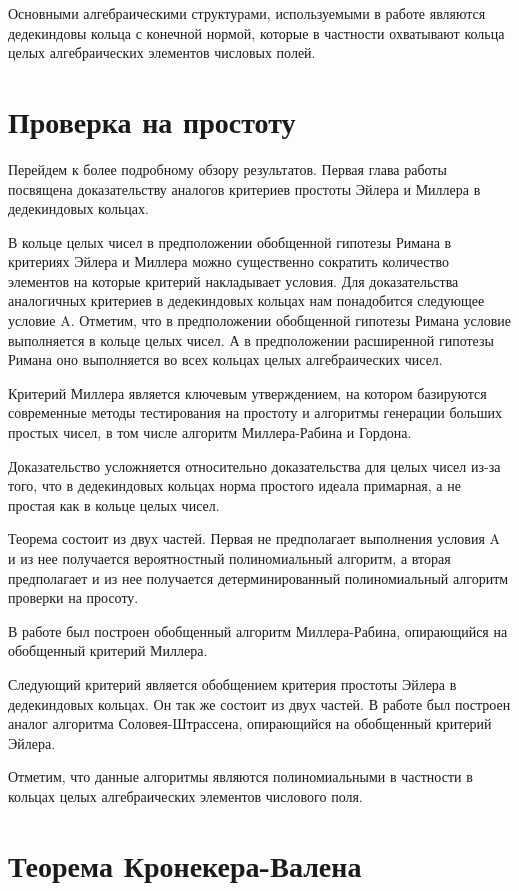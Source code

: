 \documentclass[a4paper,12pt]{article} %
\begin{document}
Основными алгебраическими структурами, используемыми в работе являются дедекиндовы кольца с конечной нормой, которые в частности охватывают кольца целых алгебраических элементов числовых полей.

\section{Проверка на простоту}

Перейдем к более подробному обзору результатов.
Первая глава работы посвящена доказательству аналогов критериев простоты Эйлера и Миллера в дедекиндовых кольцах.

В кольце целых чисел в предположении обобщенной гипотезы Римана в критериях Эйлера и Миллера можно существенно сократить количество элементов на которые критерий накладывает условия.
Для доказательства аналогичных критериев в дедекиндовых кольцах нам понадобится следующее условие A.
Отметим, что в предположении обобщенной гипотезы Римана условие выполняется в кольце целых чисел.
А в предположении расширенной гипотезы Римана оно выполняется во всех кольцах целых алгебраических чисел.

Критерий Миллера является ключевым утверждением, на котором базируются современные методы тестирования на простоту и алгоритмы генерации больших простых чисел, в том числе алгоритм Миллера-Рабина и Гордона.

Доказательство усложняется относительно доказательства для целых чисел из-за того, что в дедекиндовых кольцах норма простого идеала примарная, а не простая как в кольце целых чисел.

Теорема состоит из двух частей.
Первая не предполагает выполнения условия A и из нее получается вероятностный полиномиальный алгоритм, а вторая предполагает и из нее получается детерминированный полиномиальный алгоритм проверки на просоту.

В работе был построен обобщенный алгоритм Миллера-Рабина, опирающийся на обобщенный критерий Миллера.

Следующий критерий является обобщением критерия простоты Эйлера в дедекиндовых кольцах.
Он так же состоит из двух частей.
В работе был построен аналог алгоритма Соловея-Штрассена, опирающийся на обобщенный критерий Эйлера.

Отметим, что данные алгоритмы являются полиномиальными в частности в кольцах целых алгебраических элементов числового поля.

\section{Теорема Кронекера-Валена}
\end{document}
